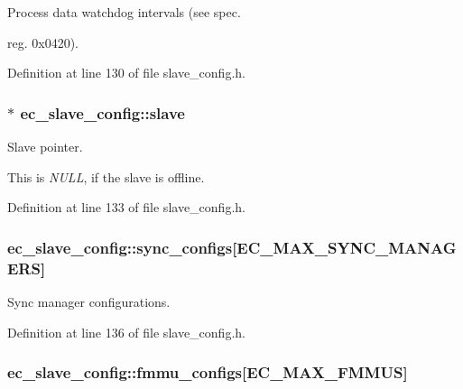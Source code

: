 \-Process data watchdog intervals (see spec. 

reg. 0x0420). 

\-Definition at line 130 of file slave\-\_\-config.\-h.

\subsubsection[{slave}]{$\ast$ {\bf ec\-\_\-slave\-\_\-config\-::slave}}\label{structec__slave__config_ad1c2b1916ca2208c52cf0acbf6f1a8c7}


\-Slave pointer. 

\-This is {\itshape \-N\-U\-L\-L\/}, if the slave is offline. 

\-Definition at line 133 of file slave\-\_\-config.\-h.

\subsubsection[{sync\-\_\-configs}]{ {\bf ec\-\_\-slave\-\_\-config\-::sync\-\_\-configs}[{\bf \-E\-C\-\_\-\-M\-A\-X\-\_\-\-S\-Y\-N\-C\-\_\-\-M\-A\-N\-A\-G\-E\-R\-S}]}\label{structec__slave__config_a28bf292a581f2af8696f41fa333ba0f3}


\-Sync manager configurations. 



\-Definition at line 136 of file slave\-\_\-config.\-h.

\subsubsection[{fmmu\-\_\-configs}]{ {\bf ec\-\_\-slave\-\_\-config\-::fmmu\-\_\-configs}[{\bf \-E\-C\-\_\-\-M\-A\-X\-\_\-\-F\-M\-M\-U\-S}]}\label{structec__slave__config_a87548f86b5a467a0d2da312571bac4c0}


